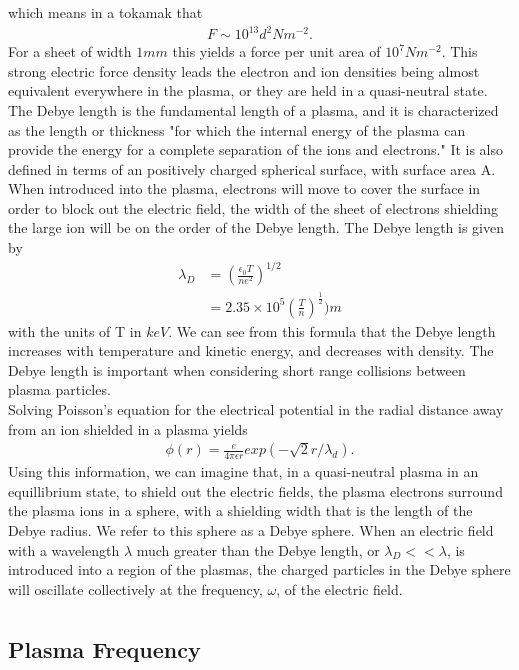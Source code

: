 \documentclass{article}
\begin{document}
which means in a tokamak that
\begin{align*}
F \sim 10^{13} d^2 N m^{-2}.
\end{align*} 
For a sheet of width $1mm$ this yields a force per unit area of $10^7Nm^{-2}$. This strong electric force density leads the electron and ion densities being almost equivalent everywhere in the plasma, or they are held in a quasi-neutral state.\\
The Debye length is the fundamental length of a plasma, and it is characterized as the length or thickness "for which the internal energy of the plasma can provide the energy for a complete separation of the ions and electrons." \cite{Wesson} It is also defined in terms of an positively charged spherical surface, with surface area A. When introduced into the plasma, electrons will move to cover the surface in order to block out the electric field, the width of the sheet of electrons shielding the large ion will be on the order of the Debye length. The Debye length is given by
\begin{align*}
\lambda_D &= (\frac{\epsilon_0T}{ne^2})^{1/2}\\
		&=2.35\times10^5(\frac{T}{n})^{\frac{1}{2}})m
\end{align*}
with the units of T in $keV$. We can see from this formula that the Debye length increases with temperature and kinetic energy, and decreases with density. The Debye length is important when considering short range collisions between plasma particles.\\
Solving Poisson's equation for the electrical potential in the radial distance away from an ion shielded in a plasma yields
\begin{align*}
\phi(r) = \frac{e}{4\pi \epsilon r}exp(-\sqrt{2}r/\lambda_d).
\end{align*}
Using this information, we can imagine that, in a quasi-neutral plasma in an equillibrium state, to shield out the electric fields, the plasma electrons surround the plasma ions in a sphere, with a shielding width that is the length of the Debye radius. We refer to this sphere as a Debye sphere. When an electric field with a wavelength $\lambda$ much greater than the Debye length, or $\lambda_D << \lambda$, is introduced into a region of the plasmas, the charged particles in the Debye sphere will oscillate collectively at the frequency, $\omega$, of the electric field. 
\begin{align*}
\end{align*}
\subsection{Plasma Frequency}
\end{document}
